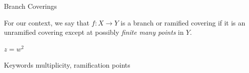 \documentclass{beamer}
\newcommand{\CC}{\mathbb{C}}
\begin{document}
    


\begin{frame}{Branch Coverings}
    \begin{definition}
        For our context, we say that $f: X \to Y$ is a branch or ramified covering if it is an unramified covering except at possibly \emph{finite many points} in $Y$.
    \end{definition}
    \begin{example}
    $z = w^2$
    \end{example}
    
    \vfill
    \begin{block}{\tiny{Keywords}}
    \tiny{multiplicity, ramification points}
    \end{block}
\end{frame}

\end{document}
